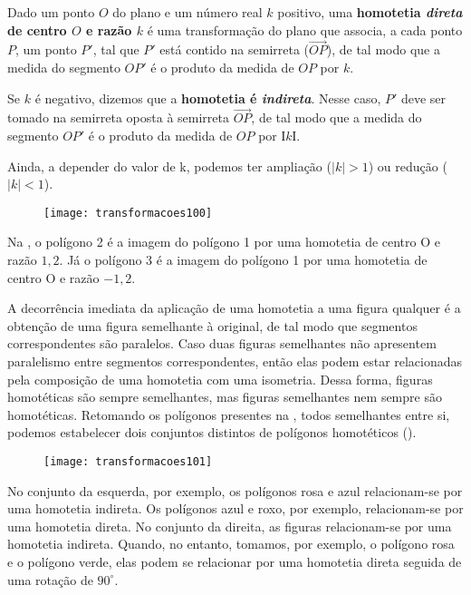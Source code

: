 Dado um ponto $O$ do plano e um número real $k$ positivo, uma \textbf{homotetia \textit{direta} de centro $O$ e razão $k$} é uma transformação do plano que associa, a cada ponto $P$, um ponto $P'$, tal que $P'$ está contido na semirreta ($\overrightarrow{OP}$), de tal modo que a medida do segmento $OP'$ é o produto da medida de $OP$ por $k$. 

Se $k$ é negativo, dizemos que a \textbf{homotetia é \textit{indireta}}. Nesse caso, $P'$ deve ser tomado na semirreta oposta à semirreta $\overrightarrow{OP}$, de tal modo que a medida do segmento $OP'$ é o produto da medida de $OP$ por $ӀkӀ$. 

Ainda, a depender do valor de k, podemos ter ampliação ($|k|>1$) ou redução ($|k|<1$). 

\begin{figure}[H]
\centering

\texttt{[image: transformacoes100]}
\caption{}
\label{transformacoes100}
\end{figure}
 
Na , o polígono 2 é a imagem do polígono 1 por uma homotetia de centro O e razão $1{,}2$. Já o polígono 3 é a imagem do polígono 1 por uma homotetia de centro O e razão $-1{,}2$. 

A decorrência imediata da aplicação de uma homotetia a uma figura qualquer é a obtenção de uma figura semelhante à original, de tal modo que segmentos correspondentes são paralelos. Caso duas figuras semelhantes não apresentem paralelismo entre segmentos correspondentes, então elas podem estar relacionadas pela composição de uma homotetia com uma isometria.
Dessa forma, figuras homotéticas são sempre semelhantes, mas figuras semelhantes nem sempre são homotéticas. Retomando os polígonos presentes na , todos semelhantes entre si, podemos estabelecer dois conjuntos distintos de polígonos homotéticos (). 

\begin{figure}[H]
\centering

\texttt{[image: transformacoes101]}
\caption{}
\label{transformacoes101}
\end{figure}
 
No conjunto da esquerda, por exemplo, os polígonos rosa e azul relacionam-se por uma homotetia indireta. Os polígonos azul e roxo, por exemplo, relacionam-se por uma homotetia direta. No conjunto da direita, as figuras relacionam-se por uma homotetia indireta. Quando, no entanto, tomamos, por exemplo, o polígono rosa e o polígono verde, elas podem se relacionar por uma homotetia direta seguida de uma rotação de $90^{\circ}$. 

